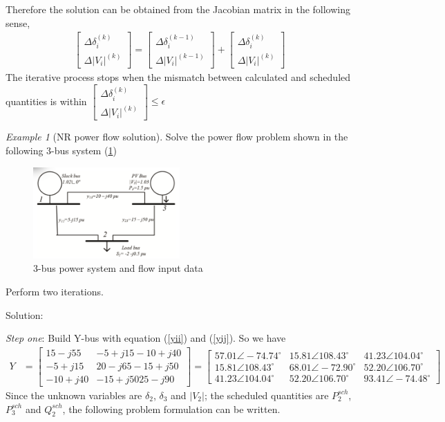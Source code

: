 \documentclass[11pt, oneside, reqno]{amsart}
\numberwithin{equation}{section}
\theoremstyle{plain}%
\theoremstyle{definition}
\theoremstyle{remark}
\newtheorem{eg}{Example}
\begin{document}
Therefore the solution can be obtained from the Jacobian matrix in the following sense,
\begin{align*}
	\begin{bmatrix}
	\Delta \delta^{(k)}_i\\
	\Delta |V_i|^{(k)}
	\end{bmatrix}
	=\begin{bmatrix}
	\Delta \delta^{(k-1)}_i\\
	\Delta |V_i|^{(k-1)}
	\end{bmatrix}
	+\begin{bmatrix}
	\Delta \delta^{(k)}_i\\
	\Delta |V_i|^{(k)}
	\end{bmatrix}
\end{align*}
The iterative process stops when the mismatch between calculated and scheduled quantities is within 
$\begin{bmatrix}
	\Delta \delta^{(k)}_i\\
	\Delta |V_i|^{(k)}
	\end{bmatrix}\leq\epsilon$

\begin{eg}[NR power flow solution]
	Solve the power flow problem shown in the following 3-bus system (\ref{fig:eg5})
	\begin{figure}[!ht]
  \centering
    \includegraphics[width=0.5\textwidth]{fig5.png}
    \caption[figure 5]{3-bus power system and flow input data}
    \label{fig:eg5}
    \end{figure}
	 Perform two iterations.
\end{eg}

Solution:

\textit{Step one}: Build Y-bus with equation (\ref{yii}) and (\ref{yij}). So we have
\begin{align*}
	Y&=
	\begin{bmatrix}
		15-j55 & -5+j15 -10+j40\\
		-5+j15 & 20-j65 -15+j50\\
		-10+j40 & -15+j50 25-j90
	\end{bmatrix}
	=
	\begin{bmatrix}
		57.01\angle -74.74^{\circ} & 15.81\angle 108.43^{\circ} & 41.23\angle 104.04^{\circ}\\
		15.81\angle 108.43^{\circ} & 68.01\angle -72.90^{\circ} & 52.20\angle 106.70^{\circ}\\
		41.23\angle 104.04^{\circ} & 52.20\angle 106.70^{\circ} & 93.41\angle -74.48^{\circ}
	\end{bmatrix}
\end{align*}
Since the unknown variables are $\delta_2$, $\delta_3$ and $|V_2|$; the scheduled quantities are 
$P^{sch}_2$, $P^{sch}_3$ and $Q^{sch}_2$, the following problem formulation can be written.
\end{document}
